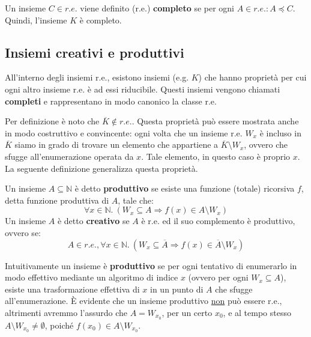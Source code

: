 \documentclass[a4paper]{article}
\begin{document}
	\noindent
	Un insieme $C \in r.e.$ viene definito (r.e.) \textcolor{Red3}{\textbf{completo}} se per ogni $A \in r.e.: A \preceq C$. Quindi, l'insieme $K$ è completo.\newpage
	
	\subsection{Insiemi creativi e produttivi}
	
	All'interno degli insiemi r.e., esistono insiemi (e.g. $K$) che hanno proprietà per cui ogni altro insieme r.e. è ad essi riducibile. Questi insiemi vengono chiamati \textbf{completi} e rappresentano in modo canonico la classe r.e.
	
	Per definizione è noto che $\overline{K} \notin r.e.$. Questa proprietà può essere mostrata anche in modo costruttivo e convincente: ogni volta che un insieme r.e. $W_{x}$ è incluso in $\overline{K}$ siamo in grado di trovare un elemento che appartiene a $\overline{K} \setminus W_{x}$, ovvero che sfugge all'enumerazione operata da $x$. Tale elemento, in questo caso è proprio $x$. La seguente definizione generalizza questa proprietà.\newline
	
	\noindent
	Un insieme $A \subseteq \mathbb{N}$ è detto \textcolor{Red3}{\textbf{produttivo}} se esiste una funzione (totale) ricorsiva $f$, detta funzione produttiva di $A$, tale che:
	\begin{equation*}
		\forall x \in \mathbb{N}. \: \left(W_{x} \subseteq A \Longrightarrow f\left(x\right) \in A \setminus W_{x}\right)
	\end{equation*}
	Un insieme $A$ è detto \textcolor{Red3}{\textbf{creativo}} se $A$ è r.e. ed il suo complemento è produttivo, ovvero se:
	\begin{equation*}
		A \in r.e., \forall x \in \mathbb{N}. \: \left(W_{x} \subseteq \overline{A} \Longrightarrow f\left(x\right) \in \overline{A} \setminus W_{x}\right)
	\end{equation*}
	
	Intuitivamente un insieme è \textbf{produttivo} se per ogni tentativo di enumerarlo in modo effettivo mediante un algoritmo di indice $x$ (ovvero per ogni $W_{x} \subseteq A$), esiste una trasformazione effettiva di $x$ in un punto di $A$ che sfugge all'enumerazione. È evidente che un insieme produttivo \underline{non} può essere r.e., altrimenti avremmo l'assurdo che $A = W_{x_{0}}$, per un certo $x_{0}$, e al tempo stesso $A \setminus W_{x_{0}} \ne \emptyset$, poiché $f\left(x_{0}\right) \in A \setminus W_{x_{0}}$.
	
\end{document}
